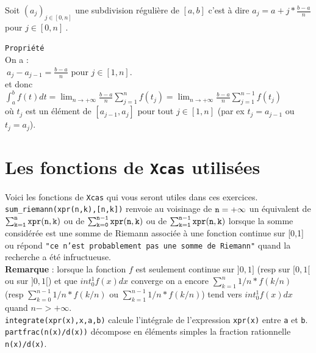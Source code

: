 \documentclass[a4paper,11pt]{book}
\begin{document}
Soit $(a_j)_{j \in [0,n]}$ une subdivision r\'eguli\`ere de $[a,b]$ c'est \`a
 dire $\displaystyle a_j=a+j*\frac{b-a}{n}$ pour $j \in [0,n]\ $. 

{\tt Propri\'et\'e}\\
On a :\\
 $\displaystyle \ a_j-a_{j-1}=\frac{b-a}{n}$ pour $j \in [1,n]$.\\
et donc \\
$\displaystyle \int_a^b f(t) dt=\lim_{n \rightarrow +\infty}\frac{b-a}{n}\sum_{j=1}^n f(t_j)=\lim_{n \rightarrow +\infty}\frac{b-a}{n}\sum_{j=1}^{n-1} f(t_j)$\\
o\`u $t_j$ est un \'el\'ement de 
$[a_{j-1},a_{j}]$ pour tout $j \in [1,n]$ 
(par ex $t_j=a_{j-1}$ ou $t_j= a_{j}$).
\section{Les fonctions de {\tt Xcas} utilis\'ees}
Voici les fonctions de {\tt Xcas} qui vous seront utiles dans ces exercices.\\ 
{\tt sum\_riemann(xpr(n,k),[n,k])} renvoie au voisinage de
 ${\tt n=+\infty}$ un \'equivalent de ${\tt \sum_{k=1}^n xpr(n,k)}$ ou de 
${\tt \sum_{k=0}^{n-1} xpr(n,k)}$ ou de ${\tt \sum_{k=1}^{n-1} xpr(n,k)}$ 
lorsque la somme consid\'er\'ee est une somme de Riemann associ\'ee \`a une 
fonction continue sur [0,1] ou r\'epond 
{\tt "ce n'est probablement pas une somme de Riemann"} quand 
la recherche a \'et\'e infructueuse.\\
{\bf Remarque} : lorsque la fonction $f$ est seulement continue sur $]0,1]$ 
(resp sur $[0,1[$ ou sur $]0,1[$)
et que $int_0^1f(x)dx$ converge on a encore $\sum_{k=1}^n 1/n*f(k/n)$ 
(resp $ \sum_{k=0}^{n-1} 1/n*f(k/n)$ ou  $ \sum_{k=1}^{n-1} 1/n*f(k/n)$) 
tend vers $int_0^1f(x)dx$ quand $n->+\infty$.\\
{\tt integrate(xpr(x),x,a,b)} calcule l'int\'egrale de l'expression 
{\tt xpr(x)} entre {\tt a} et {\tt b}.\\
{\tt partfrac(n(x)/d(x))} d\'ecompose en \'el\'ements simples la fraction 
rationnelle {\tt n(x)/d(x)}.
\end{document}
